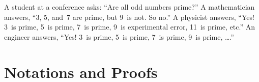 \documentclass[twocolumn]{article}
\begin{document}
A student at a conference asks: ``Are all odd numbers prime?''
A mathematician answers, ``3, 5, and~7 are prime, but 9~is
not.  So no.''
A physicist answers, ``Yes!  3~is prime, 5~is prime, 7~is prime, 9~is
experimental error, 11~is prime, etc.''
An engineer answers, ``Yes!  3~is prime, 5~is prime, 7~is prime, 9~is
prime, \ldots.''




\appendix

\section{Notations and Proofs}
\end{document}
